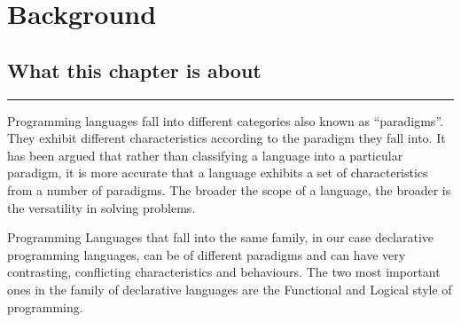 \documentclass[thesis-solanki.tex]{subfiles}
\begin{document}
\chapter{Background}\label{chap:background}

\section{What this chapter is about}

\noindent\rule{\textwidth}{0.5pt}

Programming languages fall into different categories also known as ``paradigms''.
They exhibit different characteristics according to the paradigm they fall into.
It has been argued \cite{Krishnamurthi:2008:TPL:1480828.1480846} that
rather than classifying a language into a particular paradigm,
it is
more accurate that a language exhibits a set of characteristics from a
number of paradigms.
The broader the scope of a language, the broader is the versatility in solving problems.

Programming Languages that fall into the same family, in our case declarative programming languages, can be of
different paradigms and can have very contrasting, conflicting characteristics and behaviours.
The two most important ones in the family of declarative languages are the Functional and Logical style of
programming.
\end{document}
